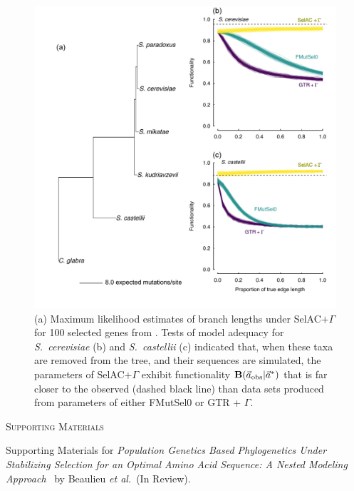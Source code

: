 \documentclass[12pt,letterpaper]{article}
\renewcommand{\section}[1]{%
\bigskip
\begin{center}
\begin{Large}
\normalfont\scshape #1
\medskip
\end{Large}
\end{center}}
\newcommand{\Funcaobsvec}{\ensuremath{\Func(\aobsvec|\aoptvec)}\xspace}
\newcommand{\Func}{\ensuremath{\text{\textbf{B}}}\xspace}
\newcommand{\selacplusgamma}{SelAC$+\Gamma$\xspace}
\newcommand{\aobsvec}{\ensuremath{\Vec{a}_{\text{obs}}}\xspace}
\newcommand{\aoptvec}{\ensuremath{\Vec{a}^*}\xspace}
\begin{document}
\begin{figure}[H]
  \centering
  \includegraphics[width=0.9\linewidth]{FIGURE_3_Inferred_Tree_AND_Model_Adequacy.pdf}
  \caption{(a) Maximum likelihood estimates of branch lengths under \selacplusgamma for 100 selected genes from \citet{SalichosAndRokas2013}.
    Tests of model adequacy for \emph{S.~cerevisiae} (b) and \emph{S.~castellii} (c) indicated that, when these taxa are removed from the tree, and their sequences are simulated, the parameters of \selacplusgamma exhibit functionality \Funcaobsvec that is far closer to the observed (dashed black line) than data sets produced from parameters of either FMutSel0 or GTR + $\Gamma$.
}
  \label{fig:TreeAndAdequacy}
\end{figure}


\clearpage

\setcounter{figure}{0}
\setcounter{table}{0}
\setcounter{page}{1}
\setcounter{section}{0}

\renewcommand{\thefigure}{S\arabic{figure}}
\renewcommand{\thetable}{S\arabic{table}}
\renewcommand{\thepage}{S\arabic{page}}
\renewcommand{\thesection}{\arabic{section}} %
\renewcommand{\appendixname}{Supporting Materials}
\renewcommand{\theequation}{S\arabic{equation}}

\setcounter{equation}{0}
\appendix



\section{Supporting Materials}
Supporting Materials for \emph{Population Genetics Based Phylogenetics Under Stabilizing Selection for an Optimal Amino Acid Sequence: A Nested Modeling Approach} \ by Beaulieu \emph{et al.}~(In Review).
\end{document}
